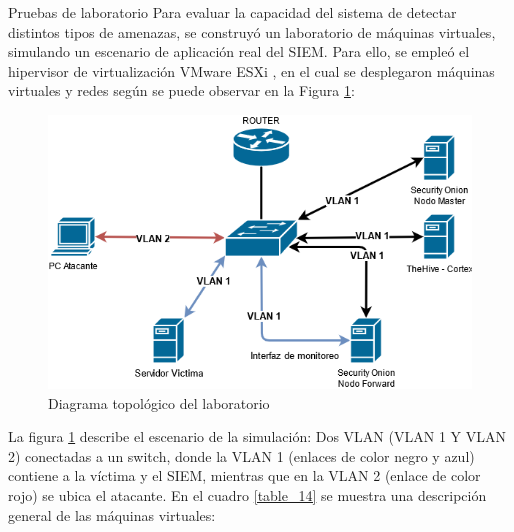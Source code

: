     \begin{section}{Pruebas de laboratorio}
    Para evaluar la capacidad del sistema de detectar distintos tipos de amenazas, se construyó un laboratorio de máquinas virtuales, simulando un escenario de aplicación real del SIEM. Para ello, se empleó el hipervisor de virtualización VMware ESXi \cite{vmware}, en el cual se desplegaron máquinas virtuales y redes según se puede observar en la Figura \ref{fig:laboratorio-sim}:
    \begin{figure}[H]
    \centering
    \includegraphics[width=1\textwidth]{./iteracion_3_imagenes/Propuesta_de_laboratorio_de_ataques.png}
    \caption{Diagrama topológico del laboratorio}
    \label{fig:laboratorio-sim}
    \end{figure}
    \FloatBarrier
    La figura \ref{fig:laboratorio-sim} describe el escenario de la simulación: Dos VLAN (VLAN 1 Y VLAN 2) conectadas a un switch, donde la VLAN 1 (enlaces de color negro y azul) contiene a la víctima y el SIEM, mientras que en la VLAN 2 (enlace de color rojo) se ubica el atacante. 
    En el cuadro \ref{table_14} se muestra una descripción general de las máquinas virtuales:
    \begin{table}[H]
    \caption{Descripción general de las máquinas virtuales}
    \label{table_14}
    \end{table}
   

\end{section}
